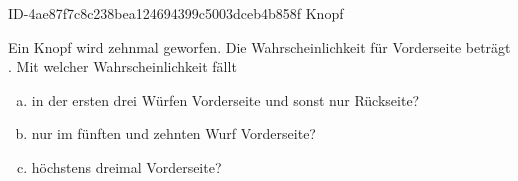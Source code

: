 \begin{exercise}
      {ID-4ae87f7c8c238bea124694399c5003dceb4b858f}
      {Knopf}
  \ifproblem\problem\par
    Ein Knopf wird zehnmal geworfen. Die Wahrscheinlichkeit für \glqq Vorderseite\grqq{}
    beträgt . Mit welcher Wahrscheinlichkeit fällt
    \begin{enumerate}[a)]
      \item in der ersten drei Würfen \glqq Vorderseite\grqq{} und sonst nur
            \glqq Rückseite\grqq?
      \item nur im fünften und zehnten Wurf \glqq Vorderseite\grqq?
      \item höchstens dreimal \glqq Vorderseite\grqq?
    \end{enumerate}
  \fi
\end{exercise}
